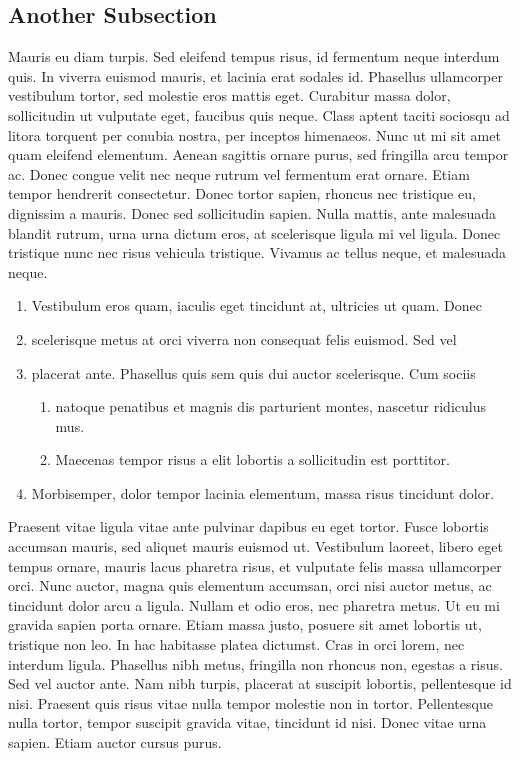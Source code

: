 \subsection{Another Subsection}

Mauris eu diam turpis. Sed eleifend tempus risus, id fermentum neque interdum quis. In viverra euismod mauris, et lacinia erat sodales id. Phasellus ullamcorper vestibulum tortor, sed molestie eros mattis eget. Curabitur massa dolor, sollicitudin ut vulputate eget, faucibus quis neque. Class aptent taciti sociosqu ad litora torquent per conubia nostra, per inceptos himenaeos. Nunc ut mi sit amet quam eleifend elementum. Aenean sagittis ornare purus, sed fringilla arcu tempor ac. Donec congue velit nec neque rutrum vel fermentum erat ornare. Etiam tempor hendrerit consectetur. Donec tortor sapien, rhoncus nec tristique eu, dignissim a mauris. Donec sed sollicitudin sapien. Nulla mattis, ante malesuada blandit rutrum, urna urna dictum eros, at scelerisque ligula mi vel ligula. Donec tristique nunc nec risus vehicula tristique. Vivamus ac tellus neque, et malesuada neque. 


\begin{enumerate}
\item Vestibulum eros quam, iaculis eget tincidunt at, ultricies ut quam. Donec 

\item scelerisque metus at orci viverra non consequat felis euismod. Sed vel 

\item placerat ante. Phasellus quis sem quis dui auctor scelerisque. Cum sociis 

\begin{enumerate}
\item  natoque penatibus et magnis dis parturient montes, nascetur ridiculus mus. 

\item Maecenas tempor risus a elit lobortis a sollicitudin est porttitor.  
\end{enumerate}

\item Morbisemper, dolor tempor lacinia elementum, massa risus tincidunt dolor. 

\end{enumerate}

Praesent vitae ligula vitae ante pulvinar dapibus eu eget tortor. Fusce lobortis accumsan mauris, sed aliquet mauris euismod ut. Vestibulum laoreet, libero eget tempus ornare, mauris lacus pharetra risus, et vulputate felis massa ullamcorper orci. Nunc auctor, magna quis elementum accumsan, orci nisi auctor metus, ac tincidunt dolor arcu a ligula. Nullam et odio eros, nec pharetra metus. Ut eu mi gravida sapien porta ornare. Etiam massa justo, posuere sit amet lobortis ut, tristique non leo. In hac habitasse platea dictumst. Cras in orci lorem, nec interdum ligula. Phasellus nibh metus, fringilla non rhoncus non, egestas a risus. Sed vel auctor ante. Nam nibh turpis, placerat at suscipit lobortis, pellentesque id nisi. Praesent quis risus vitae nulla tempor molestie non in tortor. Pellentesque nulla tortor, tempor suscipit gravida vitae, tincidunt id nisi. Donec vitae urna sapien. Etiam auctor cursus purus. 

